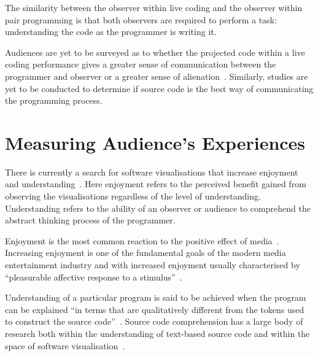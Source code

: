 The similarity between the observer within live coding and the observer within pair programming is that both observers are required to perform a task: understanding the code as the programmer is writing it.

Audiences are yet to be surveyed as to whether the projected code within a live coding performance gives a greater sense of communication between the programmer and observer or a greater sense of alienation~\cite{Mclean2011}. Similarly, studies are yet to be conducted to determine if source code is the best way of communicating the programming process.

\section{Measuring Audience's Experiences}

\more


There is currently a search for software visualisations that increase enjoyment and understanding~\cite{McLean2010a}. Here enjoyment refers to the perceived benefit gained from observing the visualisations regardless of the level of understanding. Understanding refers to the ability of an observer or audience to comprehend the abstract thinking process of the programmer.

Enjoyment is the most common reaction to the positive effect of media~\cite{Vorderer2004}. Increasing enjoyment is one of the fundamental goals of the modern media entertainment industry and with increased enjoyment usually characterised by ``pleasurable affective response to a stimulus''~\cite{Brock2004}.


Understanding of a particular program is said to be achieved when the program can be explained ``in terms that are qualitatively different from the tokens used to construct the source code''~\cite{Biggerstaff1994}. Source code comprehension has a large body of research both within the understanding of text-based source code and within the space of software visualisation~\cite{Hosking2005}.

